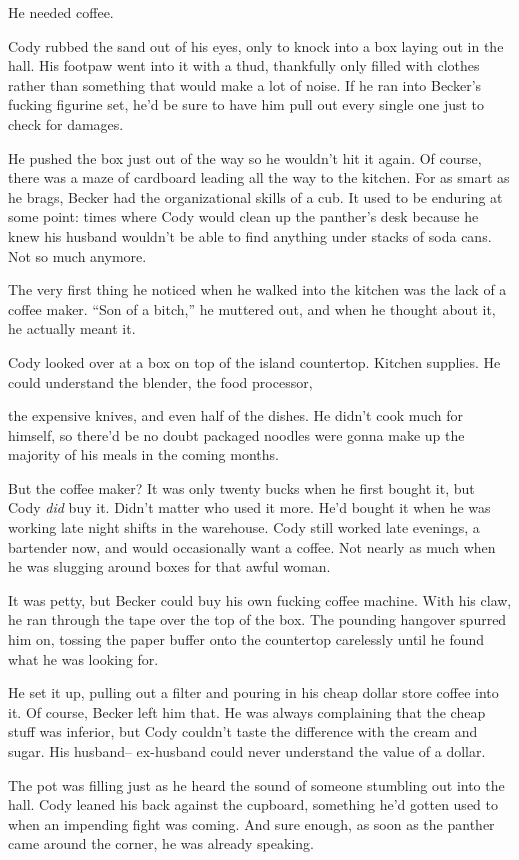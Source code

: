 He needed coffee.

Cody rubbed the sand out of his eyes, only to knock into a box laying
out in the hall. His footpaw went into it with a thud, thankfully only
filled with clothes rather than something that would make a lot of
noise. If he ran into Becker's fucking figurine set, he'd be sure to
have him pull out every single one just to check for damages.

He pushed the box just out of the way so he wouldn't hit it again. Of
course, there was a maze of cardboard leading all the way to the
kitchen. For as smart as he brags, Becker had the organizational skills
of a cub. It used to be enduring at some point: times where Cody would
clean up the panther's desk because he knew his husband wouldn't be able
to find anything under stacks of soda cans. Not so much anymore.

The very first thing he noticed when he walked into the kitchen was the
lack of a coffee maker. ``Son of a bitch,'' he muttered out, and when he
thought about it, he actually meant it.

Cody looked over at a box on top of the island countertop. Kitchen
supplies. He could understand the blender, the food processor,

the expensive knives, and even half of the dishes. He didn't cook much
for himself, so there'd be no doubt packaged noodles were gonna make up
the majority of his meals in the coming months.

But the coffee maker? It was only twenty bucks when he first bought it,
but Cody \emph{did} buy it. Didn't matter who used it more. He'd bought
it when he was working late night shifts in the warehouse. Cody still
worked late evenings, a bartender now, and would occasionally want a
coffee. Not nearly as much when he was slugging around boxes for that
awful woman.

It was petty, but Becker could buy his own fucking coffee machine. With
his claw, he ran through the tape over the top of the box. The pounding
hangover spurred him on, tossing the paper buffer onto the countertop
carelessly until he found what he was looking for.

He set it up, pulling out a filter and pouring in his cheap dollar store
coffee into it. Of course, Becker left him that. He was always
complaining that the cheap stuff was inferior, but Cody couldn't taste
the difference with the cream and sugar. His husband-- ex-husband
could never understand the value of a dollar.

The pot was filling just as he heard the sound of someone stumbling out
into the hall. Cody leaned his back against the cupboard, something he'd
gotten used to when an impending fight was coming. And sure enough, as
soon as the panther came around the corner, he was already speaking.

